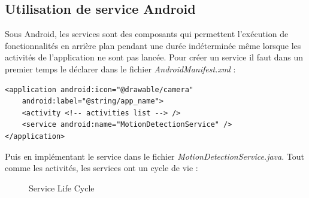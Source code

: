 \subsection{Utilisation de service Android}
Sous Android, les services sont des composants qui permettent l'exécution de
fonctionnalités en arrière plan pendant une durée indéterminée même lorsque les
activités de l'application ne sont pas lancée.
Pour créer un service il faut dans un premier temps le déclarer dans le fichier
\textit{AndroidManifest.xml} :\newline
\begin{lstlisting}[format=XML]
<application android:icon="@drawable/camera" 
	android:label="@string/app_name">
	<activity <!-- activities list --> />
	<service android:name="MotionDetectionService" />
</application>
\end{lstlisting}
Puis en implémentant le service dans le fichier
\textit{MotionDetectionService.java}.
 Tout comme les activités, les services ont
un cycle de vie :
\newpage
\begin{center}
\begin{figure}
   \label{serviceLifecycle}
  \centering
   \caption{Service Life Cycle \protect\footnotemark}
  \end{figure}
  \end{center}


